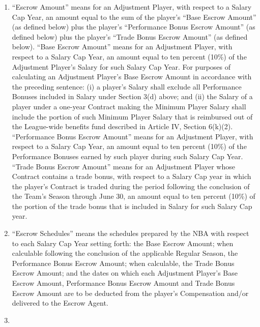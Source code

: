 \documentclass[
]{book}
\begin{document}
\begin{enumerate}
\begin{enumerate}
  \item
    ``Escrow Amount'' means for an Adjustment Player, with respect to a Salary Cap Year, an amount equal to the sum of the player's ``Base Escrow Amount'' (as defined below) plus the player's ``Performance Bonus Escrow Amount'' (as defined below) plus the player's ``Trade Bonus Escrow Amount'' (as defined below). ``Base Escrow Amount'' means for an Adjustment Player, with respect to a Salary Cap Year, an amount equal to ten percent (10\%) of the Adjustment Player's Salary for such Salary Cap Year. For purposes of calculating an Adjustment Player's Base Escrow Amount in accordance with the preceding sentence: (i) a player's Salary shall exclude all Performance Bonuses included in Salary under Section 3(d) above; and (ii) the Salary of a player under a one-year Contract making the Minimum Player Salary shall include the portion of such Minimum Player Salary that is reimbursed out of the League-wide benefits fund described in Article IV, Section 6(k)(2). ``Performance Bonus Escrow Amount'' means for an Adjustment Player, with respect to a Salary Cap Year, an amount equal to ten percent (10\%) of the Performance Bonuses earned by such player during such Salary Cap Year. ``Trade Bonus Escrow Amount'' means for an Adjustment Player whose Contract contains a trade bonus, with respect to a Salary Cap year in which the player's Contract is traded during the period following the conclusion of the Team's Season through June 30, an amount equal to ten percent (10\%) of the portion of the trade bonus that is included in Salary for such Salary Cap year.
  \item
    ``Escrow Schedules'' means the schedules prepared by the NBA with respect to each Salary Cap Year setting forth: the Base Escrow Amount; when calculable following the conclusion of the applicable Regular Season, the Performance Bonus Escrow Amount; when calculable, the Trade Bonus Escrow Amount; and the dates on which each Adjustment Player's Base Escrow Amount, Performance Bonus Escrow Amount and Trade Bonus Escrow Amount are to be deducted from the player's Compensation and/or delivered to the Escrow Agent.
  \item

\end{enumerate}
\end{enumerate}
\end{document}
